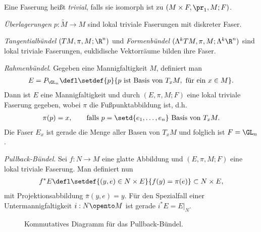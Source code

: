 \documentclass[%
	paper=a5,%
	fleqn,%
	DIV=18,%
	BCOR=0mm,
	fontsize=11pt,
	titlepage=false,%
	bibliography=totoc,
	DIV=18,%
	twoside=true,
	pdftitle=Riemannsche Geometrie,
	pdfauthor=Uwe Semmelmann,
	numbers=noendperiod]%
	{scrbook}
\begin{document}
\begin{rem}
Eine Faserung heißt \emph{trivial}, falls sie isomorph ist zu $(M\times
F,\pr_1,M;F)$.
\end{rem}

\begin{ex}
\begin{exenum}
\item \textit{Überlagerungen} $p: \tilde{M}\to M$ sind lokal triviale
Faserungen mit diskreter Faser.
\item \textit{Tangentialbündel} $(TM,\pi,M;\R^n)$ und
\textit{Formenbündel} $(\Lambda^k TM,\pi,M;\Lambda^k\R^n)$ sind lokal triviale
Faserungen, euklidische Vektorräume bilden ihre Faser.
\item {}\textit{Rahmenbündel}. Gegeben eine Mannigfaltigkeit
$M$, definiert man
\begin{align*}
E = P_{\GL_n} \defl
\setdef{p}{p\text{ ist Basis von }T_xM,\text{ für ein }x\in M}.
\end{align*}
Dann ist $E$ eine Mannigfaltigkeit und durch $(E,\pi,M;F)$ eine lokal triviale
Faserung gegeben, wobei $\pi$ die Fußpunktabbildung ist, d.h.
\begin{align*}
\pi(p) = x,\qquad \text{falls } p = \setd{e_1,\ldots,e_n} \text{ Basis von
}T_xM.
\end{align*}
Die Faser $E_x$ ist gerade die Menge aller Basen von $T_xM$ und folglich ist $F
= \GL_n$.
\item {}\textit{Pullback-Bündel}. Sei $f: N\to M$ eine
glatte Abbildung und $(E,\pi,M;F)$ eine lokal triviale Faserung. Man definiert nun
\begin{align*}
f^*E \defl \setdef{(y,e)\in N\times E}{f(y) = \pi(e)} \subset N\times E, 
\end{align*}
mit Projektionsabbildung $\bar{\pi}(y,e) = y$.
Für den Spezialfall einer Untermannigfaltigkeit $i: N\opento M$ ist gerade $i^*E
= E\big|_N$.\boxc
\end{exenum}
\end{ex}


\begin{figure}[H]
\centering
{}
\caption{Kommutatives Diagramm für das Pullback-Bündel.}
\end{figure}
\end{document}

